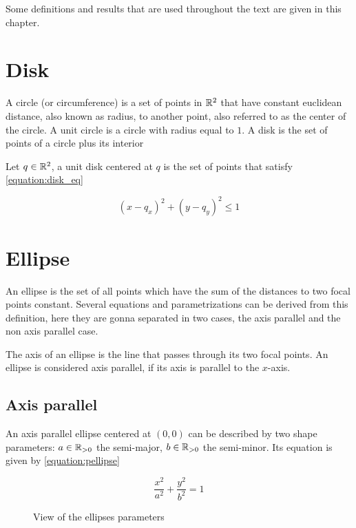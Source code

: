 Some definitions and results that are used throughout the text are given in this chapter.

\section{Disk}

A circle (or circumference) is a set of points in $\mathbb{R}^2$ that have constant euclidean distance, also known as radius, to another point, also referred to as the center of the circle. A unit circle is a circle with radius equal to $1$.
A disk is the set of points of a circle plus its interior

\begin{definicao}
Let $q \in \mathbb{R}^2$, a unit disk centered at $q$ is the set of points that satisfy \autoref{equation:disk_eq}

\begin{equation}\label{equation:disk_eq}
    (x-q_x)^2 + (y-q_y)^2 \le 1
\end{equation}
\end{definicao}


\section{Ellipse}
An ellipse is the set of all points which have the sum of the distances to two focal points constant. Several equations and parametrizations can be derived from this definition, here they are gonna separated in two cases, the axis parallel and the non axis parallel case.

The axis of an ellipse is the line that passes through its two focal points. An ellipse is considered axis parallel, if its axis is parallel to the $x$-axis.

\subsection{Axis parallel}

An axis parallel ellipse centered at $(0,0)$ can be described by two shape parameters: $a \in \mathbb{R}_{>0}$ the semi-major, $b \in \mathbb{R}_{>0}$ the semi-minor. Its equation is given by \ref{equation:pellipse}

\begin{equation}\label{equation:pellipse}
    \dfrac{x^2}{a^2} + \dfrac{y^2}{b^2} = 1
\end{equation}

\begin{figure}[H]
\centering

    \caption{View of the ellipses parameters}
    
    \fautor
    \label{fig:3ellipses_intersect}
\end{figure}


